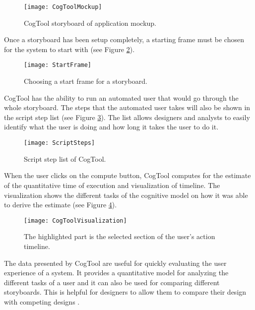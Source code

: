 \begin{figure}[H]
	\centering
	\texttt{[image: CogToolMockup]}
    \caption{CogTool storyboard of application mockup.}
    \label{fig:cogtool}
\end{figure}
        
        Once a storyboard has been setup completely, a starting frame must be chosen for the system to start with (see Figure \ref{fig:start-frame}).
        
\begin{figure}[H]
	\centering
	\texttt{[image: StartFrame]}
    \caption{Choosing a start frame for a storyboard.}
    \label{fig:start-frame}
\end{figure}
        
        CogTool has the ability to run an automated user that would go through the whole storyboard. The steps that the automated user takes will also be shown in the script step list (see Figure \ref{fig:script-step}). The list allows designers and analysts to easily identify what the user is doing and how long it takes the user to do it.
        
        
\begin{figure}[H]
	\centering
	\texttt{[image: ScriptSteps]}
    \caption{Script step list of CogTool.}
    \label{fig:script-step}
\end{figure}  

When the user clicks on the compute button, CogTool computes for the estimate of the quantitative time of execution and visualization of timeline. The visualization shows the different tasks of the cognitive model on how it was able to derive the estimate (see Figure \ref{fig:cogtool-visual}).

\begin{figure}[H]
	\centering
	\texttt{[image: CogToolVisualization]}
    \caption{The highlighted part is the selected section of the user's action timeline.}
    \label{fig:cogtool-visual}
\end{figure}

The data presented by CogTool are useful for quickly evaluating the user experience of a system. It provides a quantitative model for analyzing the different tasks of a user and it can also be used for comparing different storyboards. This is helpful for designers to allow them to compare their design with competing designs \citep{bellamy2011deploying}.

